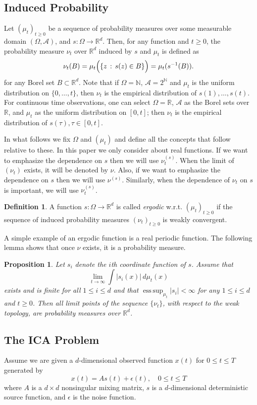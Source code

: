 \documentclass[twoside]{article}
\newcommand{\scom}[1]{s_{#1}}
\newcommand{\cset}[2]{\left\{#1\,:\,#2\right\}}
\newcommand{\ra}{\rightarrow}
\newcommand{\real}{\mathbb{R}}
\newcommand{\R}{\real}
\DeclareMathOperator{\esssup}{ess\,sup}
\renewcommand{\natural}{\mathbb{N}}
\newtheorem{prop}[lemma]{Proposition}
\theoremstyle{definition}
\newtheorem{definition}[lemma]{Definition}
\renewcommand{\AA}{\mathcal{A}}
\begin{document}
\subsection{Induced Probability}
\label{subsec:InducesProb}
Let  $(\mu_t)_{t\ge0}$ be a sequence of probability measures over some measurable domain $(\Omega,\AA)$, 
and $s: \Omega \ra \real^d$. Then,  for any function and $t\ge 0$, the probability measure $\nu_t$ over $\real^d$ induced by $s$ and $\mu_t$ is defined as
\[
\nu_t(B)= \mu_t\Bigl( \cset{z}{s(z)\in B} \Bigr)
= \mu_t ( s^{-1}(B) ).
\]
for any Borel set $B\subset \real^d$.
Note that if $\Omega = \natural$, $\AA = 2^\natural$ and $\mu_t$ is the uniform distribution on $\{0,\ldots,t\}$, then $\nu_t$ is the empirical distribution of $s(1),\ldots,s(t)$. For continuous time observations, one can select $\Omega=\R$, $\AA$ as the Borel sets over $\R$, and $\mu_t$ as the uniform distribution on $[0,t]$; then $\nu_t$ is the empirical distribution of $s(\tau), \tau \in [0,t]$.

In what follows we fix $\Omega$ and $(\mu_t)$ and define all the concepts that follow relative to these. 
In this paper we only consider about real functions. If we want to emphasize the dependence on $s$ then we will use $\nu_t^{(s)}$.
When the limit of $(\nu_t)$ exists, it will be denoted by $\nu$.
Also, if we want to emphasize the dependence on $s$ then we will use $\nu^{(s)}$.
Similarly, when the dependence of $\nu_t$ on $s$ is important, we will use $\nu^{(s)}_t$.
\begin{definition}
A function $s:\Omega \rightarrow \real^d$ is called \emph{ergodic} w.r.t. $(\mu_t)_{t\ge0}$
if the sequence of  induced probability measures $(\nu_t)_{t\ge 0}$ is weakly convergent.
\end{definition}
A simple example of an ergodic function is a real periodic function.
The following lemma shows that once $\nu$ exists, it is a probability measure. 
\begin{prop}
\label{prop:ergodicfunction}
Let $\scom{i}$ denote the $i$th coordinate function of $s$. Assume that
\[
\lim_{t\to\infty} \int |\scom{i}(x)|\, d\mu_t(x) 
\]
exists and is finite for all $1 \le i \le d$ and that $\esssup_{\mu_t} |\scom{i}|<\infty$ for any $1\le i \le d$ and $t\ge 0$.
Then all limit points of the sequence $\{\nu_t\}$, with respect to the weak topology, are probability measures over $\real^d$.
\end{prop}
\fi

\subsection{The ICA Problem}
\label{subsec:ICA}
Assume we are given a $d$-dimensional observed function $x(t)$ for $0\le t \le T$ generated by  
\begin{equation}
\label{equ:ICA}
x(t) = As(t)+\epsilon(t), \quad 0\le  t\le T
\end{equation}
where $A$ is a $d\times d$ nonsingular mixing matrix,  $s$ is a $d$-dimensional deterministic source function, and $\epsilon$ is the noise function. 
\end{document}
